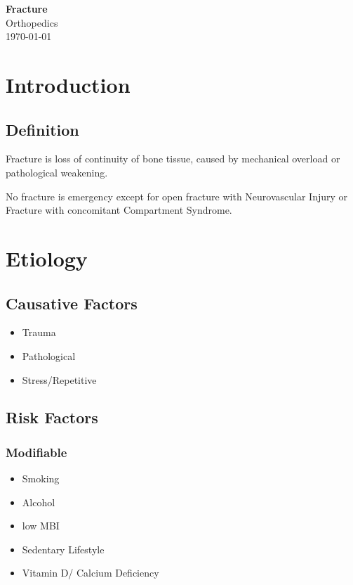 \documentclass[11pt, a4paper]{article}
\begin{document}
\begin{titlepage}
    \centering
    {\Huge \bfseries Fracture}\\[1.5cm]
    {\Large Orthopedics}\\[2cm]
    \vfill
    {\large \today}
\end{titlepage}

\tableofcontents
\pagebreak

\section{Introduction}
\subsection{Definition}
Fracture is loss of continuity of bone tissue, caused by mechanical overload or pathological weakening.

No fracture is emergency except for open fracture with Neurovascular Injury or Fracture with concomitant Compartment Syndrome.

\section{Etiology}
\subsection{Causative Factors}
\begin{itemize}
    \item Trauma
    \item Pathological
    \item Stress/Repetitive
\end{itemize}
\subsection{Risk Factors}
\subsubsection{Modifiable}
\begin{itemize}
    \item Smoking
    \item Alcohol
    \item low MBI
    \item Sedentary Lifestyle
    \item Vitamin D/ Calcium Deficiency
\end{itemize}
\end{document}
